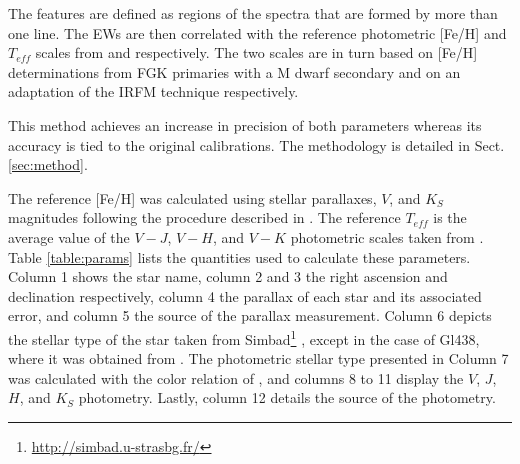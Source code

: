 \documentclass{aa}
\begin{document}
The features are defined as regions of the spectra that are formed by more than one line. The EWs are then correlated with the reference photometric [Fe/H] and $T_{eff}$ scales from \citet{Neves-2012} and \citet{Casagrande-2008} respectively. The two scales are in turn based on [Fe/H] determinations from FGK primaries with a M dwarf secondary and on an adaptation of the IRFM technique \citep{Blackwell-1977} respectively.

This method achieves an increase in precision of both parameters whereas its accuracy is tied to the original calibrations. The methodology is detailed in Sect. \ref{sec:method}. 

The reference [Fe/H] was calculated using stellar parallaxes, $V$, and $K_{S}$ magnitudes following the procedure described in \citet{Neves-2012}. The reference $T_{eff}$ is the average value of the $V-J$, $V-H$, and $V-K$ photometric scales taken from \citet{Casagrande-2008}. Table \ref{table:params} lists the quantities used to calculate these parameters. Column 1 shows the star name, column 2 and 3 the right ascension and declination respectively, column 4 the parallax of each star and its associated error, and column 5 the source of the parallax measurement. Column 6 depicts the stellar type of the star taken from Simbad\footnote{\url{http://simbad.u-strasbg.fr/}} \citep{Wenger-2000}, except in the case of Gl438, where it was obtained from \citet{Hawley-1997}. The photometric stellar type presented in Column 7 was calculated with the color relation of \citet{Lepine-2013}, and columns 8 to 11 display the $V$, $J$, $H$, and $K_{S}$ photometry. Lastly, column 12 details the source of the photometry. %

\end{document}
